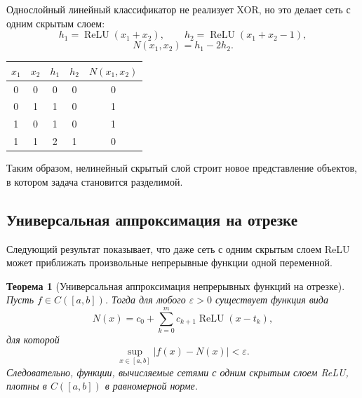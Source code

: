 \documentclass[12pt,a4paper]{article}
\newtheorem{theorem}{Теорема}[section]
\theoremstyle{definition}
\newcommand{\1}{\mathbf{1}}
\newcommand{\eps}{\varepsilon}
\DeclareMathOperator{\ReLU}{ReLU}
\begin{document}
Однослойный линейный классификатор не реализует XOR, но это делает
сеть с одним скрытым слоем:
\[
    h_1=\ReLU(x_1+x_2),
    \qquad
    h_2=\ReLU(x_1+x_2-1),
\]
\[
    N(x_1,x_2)=h_1-2h_2.
\]

\begin{center}
\begin{tabular}{ccccc}
\toprule
$x_1$ & $x_2$ & $h_1$ & $h_2$ & $N(x_1,x_2)$\\
\midrule
0 & 0 & 0 & 0 & 0\\
0 & 1 & 1 & 0 & 1\\
1 & 0 & 1 & 0 & 1\\
1 & 1 & 2 & 1 & 0\\
\bottomrule
\end{tabular}
\end{center}

Таким образом, нелинейный скрытый слой строит новое представление
объектов, в котором задача становится разделимой.

\subsection{Универсальная аппроксимация на отрезке}

Следующий результат показывает, что даже сеть с одним скрытым слоем
ReLU может приближать произвольные непрерывные функции одной
переменной.

\begin{theorem}[Универсальная аппроксимация непрерывных функций на отрезке]
Пусть $f\in C([a,b])$. Тогда для любого $\eps>0$ существует функция
вида
\[
    N(x)
    =
    c_0+
    \sum_{k=0}^{m}c_{k+1}\ReLU(x-t_k),
\]
для которой
\[
    \sup_{x\in[a,b]}|f(x)-N(x)|<\eps.
\]
Следовательно, функции, вычисляемые сетями с одним скрытым слоем ReLU,
плотны в $C([a,b])$ в равномерной норме.
\end{theorem}
\end{document}
